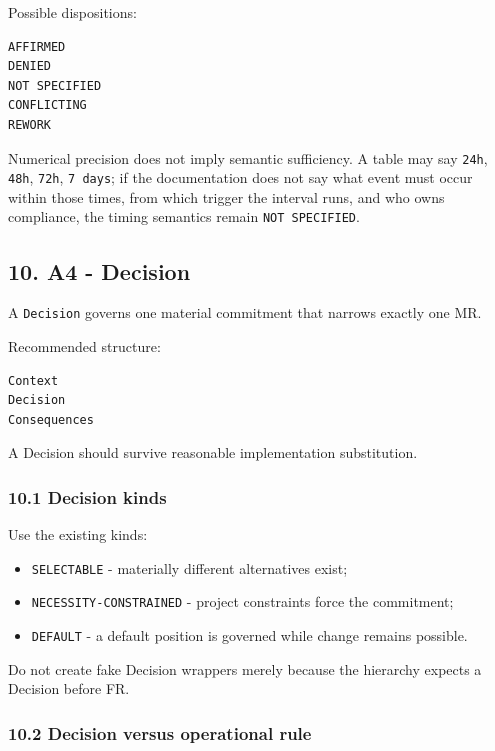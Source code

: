 \documentclass[11pt,a4paper]{article}
\providecommand{\tightlist}{\setlength{\itemsep}{0pt}\setlength{\parskip}{0pt}}
\begin{document}
Possible dispositions:

\begin{verbatim}
AFFIRMED
DENIED
NOT SPECIFIED
CONFLICTING
REWORK
\end{verbatim}

Numerical precision does not imply semantic sufficiency. A table may say
\texttt{24h}, \texttt{48h}, \texttt{72h}, \texttt{7\ days}; if the
documentation does not say what event must occur within those times,
from which trigger the interval runs, and who owns compliance, the
timing semantics remain \texttt{NOT\ SPECIFIED}.

\subsection{10. A4 - Decision}\label{10-a4---decision}

A \texttt{Decision} governs one material commitment that narrows exactly
one MR.

Recommended structure:

\begin{verbatim}
Context
Decision
Consequences
\end{verbatim}

A Decision should survive reasonable implementation substitution.

\subsubsection{10.1 Decision kinds}\label{101-decision-kinds}

Use the existing kinds:

\begin{itemize}
\tightlist
\item
  \texttt{SELECTABLE} - materially different alternatives exist;
\item
  \texttt{NECESSITY-CONSTRAINED} - project constraints force the
  commitment;
\item
  \texttt{DEFAULT} - a default position is governed while change remains
  possible.
\end{itemize}

Do not create fake Decision wrappers merely because the hierarchy
expects a Decision before FR.

\subsubsection{10.2 Decision versus operational
rule}\label{102-decision-versus-operational-rule}
\end{document}
